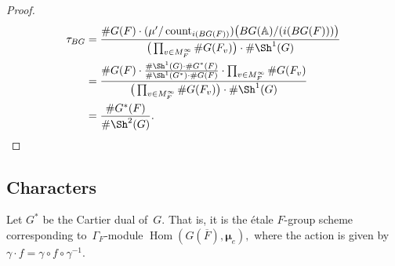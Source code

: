 \documentclass[a4paper,english,12pt]{amsart}
\newcommand{\oF}{\overline F}
\newcommand{\vMFi}{v\in M_F ^\infty}
\newcommand{\AAA}{\mathbb A}
\newcommand{\muu}{\boldsymbol{\mu}}
\DeclareMathOperator{\coun}{count}
\DeclareMathOperator{\Pic}{Pic}
\DeclareMathOperator{\Hom}{Hom}
\newtheorem{rem}[equation]{Remark}
\numberwithin{equation}{subsection}
\begin{document}
\begin{proof}
\begin{align*}
\tau_{BG}&= \frac{\# G(F)\cdot (\mu'/\coun_{i(BG(F))})\big(BG(\AAA)/(i(BG(F)))\big)}{\big(\prod_{v\in M_F^{\infty}}\# G(F_v)\big)\cdot \#\Sh^1(G)}\\
&=\frac{\# G(F)\cdot \frac{\#\Sh^1(G)\cdot \# G^*(F)}{\#\Sh^1(G^*)\cdot \#G(F)}\cdot\prod_{\vMFi}\# G(F_v)}{\big(\prod_{v\in M_F^{\infty}}\# G(F_v)\big)\cdot \#\Sh^1(G)}\\
&=\frac{\# G^*(F)}{\#\Sh^2(G)}.
\end{align*}
\end{proof}
\subsection{Characters}Let $G^*$ be the Cartier dual of~$G$. That is, it is the \' etale $F$-group scheme corresponding to~$\Gamma_F$-module $\Hom(G(\oF), \muu_e),$ where the action is given by $\gamma\cdot f=\gamma\circ f\circ\gamma^{-1}$. 
\end{document}
